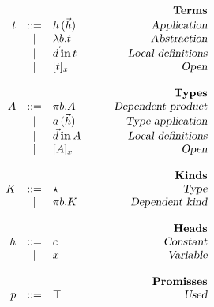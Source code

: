 \begin{figure}

\begin{center}
\begin{math}
\begin{array}{rclr}
&&&\qquad\textsl{\bf Terms}\\
t 

&::=& 
h\,(\vec{h}) 
& \qquad\textsl{Application}
\\

&|&
\lambda b. t
& \qquad\textsl{Abstraction}
\\

&|&
\vec{d} \,\textbf{in}\, t
& \qquad\textsl{Local definitions}
\\

&|&
[ t ]_{x}
& \qquad\textsl{Open}
\\
\\
&&&\qquad\textsl{\bf Types}\\
A

&::=& 
\pi b. A
& \qquad\textsl{Dependent product}
\\

&|& 
a\,(\vec{h})
& \qquad\textsl{Type application}
\\

&|& 
\vec{d} \,\textbf{in}\, A
& \qquad\textsl{Local definitions}
\\


&|& 
[ A ]_{x}
& \qquad\textsl{Open}
\\
\\
&&&\qquad\textsl{\bf Kinds}\\
K

&::=&
\star
& \qquad\textsl{Type}
\\

&|&
\pi b. K
& \qquad\textsl{Dependent kind}
\\
\\

&&&\qquad\textsl{\bf Heads}\\
h

&::=& 
c
& \qquad\textsl{Constant}
\\
&|& 
x
& \qquad\textsl{Variable}
\\
\\
&&&\qquad\textsl{\bf Promisses}\\
p 

&::=&
\top
& \qquad\textsl{Used}
\\


\end{array}
\end{math}
\end{center}
\end{figure}
